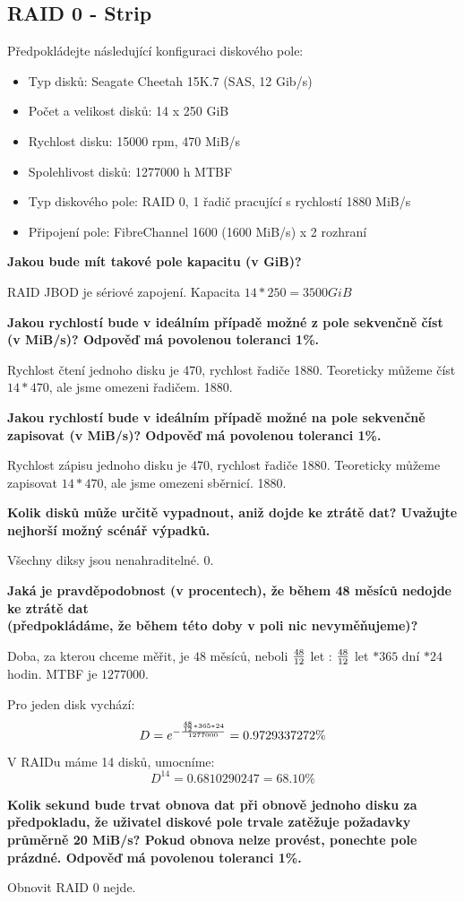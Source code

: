 \subsection{RAID 0 - Strip}
Předpokládejte následující konfiguraci diskového pole:

\begin{itemize}
    \item Typ disků: Seagate Cheetah 15K.7 (SAS, 12 Gib/s)
    \item Počet a velikost disků: 14 x 250 GiB
    \item Rychlost disku: 15000 rpm, 470 MiB/s
    \item Spolehlivost disků: 1277000 h MTBF
    \item Typ diskového pole: RAID 0, 1 řadič pracující s rychlostí 1880 MiB/s
    \item Připojení pole: FibreChannel 1600 (1600 MiB/s) x 2 rozhraní
\end{itemize}


\textbf{Jakou bude mít takové pole kapacitu (v GiB)?}

RAID JBOD je sériové zapojení. Kapacita $14*250 = 3500GiB$

\textbf{Jakou rychlostí bude v ideálním případě možné z pole sekvenčně číst (v MiB/s)? Odpověď má povolenou toleranci 1\%.}

Rychlost čtení jednoho disku je 470, rychlost řadiče 1880. Teoreticky můžeme číst $14*470$, ale jsme omezeni řadičem. 1880.

\textbf{Jakou rychlostí bude v ideálním případě možné na pole sekvenčně zapisovat (v MiB/s)? Odpověď má povolenou toleranci 1\%.}

Rychlost zápisu jednoho disku je 470, rychlost řadiče 1880. Teoreticky můžeme zapisovat $14*470$, ale jsme omezeni sběrnicí. 1880.

\textbf{Kolik disků může určitě vypadnout, aniž dojde ke ztrátě dat? Uvažujte nejhorší možný scénář výpadků.}

Všechny diksy jsou nenahraditelné. 0.

\textbf{Jaká je pravděpodobnost (v procentech), že během 48 měsíců nedojde ke ztrátě dat \\(předpokládáme, že během této doby v poli nic nevyměňujeme)?}

Doba, za kterou chceme měřit, je $48$ měsíců, neboli ${48 \over 12}$ let : ${48 \over 12}$ let $* 365$ dní $* 24$ hodin. MTBF je $1277000$. 

Pro jeden disk vychází: 
$$D = e^{-{{48 \over 12}*365*24 \over 1277000}} =  0.9729337272\%$$

V RAIDu máme 14 disků, umocníme:
$$D^{14} = 0.6810290247 = 68.10\%$$

\textbf{Kolik sekund bude trvat obnova dat při obnově jednoho disku za předpokladu, že uživatel diskové pole trvale zatěžuje požadavky průměrně 20 MiB/s? Pokud obnova nelze provést, ponechte pole prázdné. Odpověď má povolenou toleranci 1\%.}

Obnovit RAID 0 nejde.
